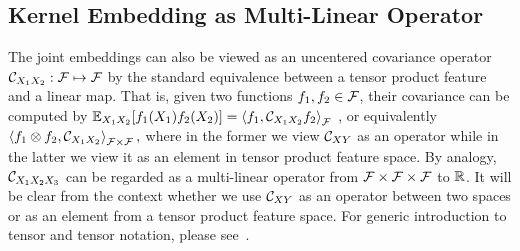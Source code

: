 \documentclass{article}
\begin{document}
\subsection{Kernel Embedding as Multi-Linear Operator}

The joint embeddings can also be viewed as an uncentered covariance operator $\mathcal{C}_{X_1X_2}:\mathcal{F}\mapsto \mathcal{F}$ by the standard equivalence between a tensor product feature and a linear map.
That is, given two functions $f_1,f_2\in\mathcal{F}$, their covariance can be computed by
$
    \mathbb{E}_{X_1X_2}[f_1(X_1)f_2(X_2)]=\left\langle f_1,\mathcal{C}_{X_1X_2} f_2 \right\rangle_{\mathcal{F}}
$
, or equivalently
$
\left\langle f_1\otimes f_2,\mathcal{C}_{X_1X_2} \right\rangle_{\mathcal{F}\times\mathcal{F}},
$
where in the former we view $\mathcal{C}_{XY}$ as an operator while in the latter we view it as an element in tensor product feature space.
By analogy, $\mathcal{C}_{X_1X_2X_3}$ can be regarded as a multi-linear operator from $\mathcal{F}\times\mathcal{F}\times\mathcal{F}$ to $\mathbb{R}$.
It will be clear from the context whether we use $\mathcal{C}_{XY}$ as an operator between two spaces or as an element from a tensor product feature space. For generic introduction to tensor and tensor notation, please see~\cite{KolBad09}.
\end{document}

